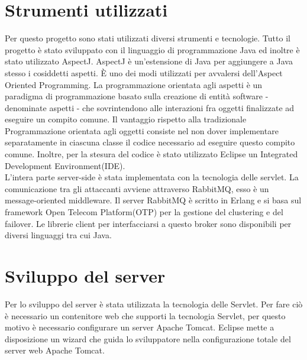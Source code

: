 \documentclass[a4paper,12pt,titlepage,oneside,openany]{book}
\begin{document}
\chapter{Strumenti utilizzati}
Per questo progetto sono stati utilizzati diversi strumenti e tecnologie. Tutto il progetto è stato sviluppato con il linguaggio di programmazione Java ed inoltre è stato utilizzato AspectJ. AspectJ\cite{aspectj} è un'estensione di Java per aggiungere a Java stesso i cosiddetti aspetti. È uno dei modi utilizzati per avvalersi dell'Aspect Oriented Programming. La programmazione orientata agli aspetti è un paradigma di programmazione basato sulla creazione di entità software - denominate aspetti - che sovrintendono alle interazioni fra oggetti finalizzate ad eseguire un compito comune. Il vantaggio rispetto alla tradizionale Programmazione orientata agli oggetti consiste nel non dover implementare separatamente in ciascuna classe il codice necessario ad eseguire questo compito comune. Inoltre, per la stesura del codice è stato utilizzato Eclipse\cite{eclipse} un Integrated Development Environment(IDE).\\
L'intera parte server-side è stata implementata con la tecnologia delle servlet. La comunicazione tra gli attaccanti avviene attraverso RabbitMQ\cite{rabbitmq}, esso è un message-oriented middleware. Il server RabbitMQ è scritto in Erlang e si basa sul framework Open Telecom Platform(OTP) per la gestione del clustering e del failover. Le librerie client per interfacciarsi a questo broker sono disponibili per diversi linguaggi tra cui Java.
\chapter{Sviluppo del server}
Per lo sviluppo del server è stata utilizzata la tecnologia delle Servlet\cite{servlet}. Per fare ciò è necessario un contenitore web che supporti la tecnologia Servlet, per questo motivo è necessario configurare un server Apache Tomcat. Eclipse mette a disposizione un wizard che guida lo sviluppatore nella configurazione totale del server web Apache Tomcat.
\end{document}
